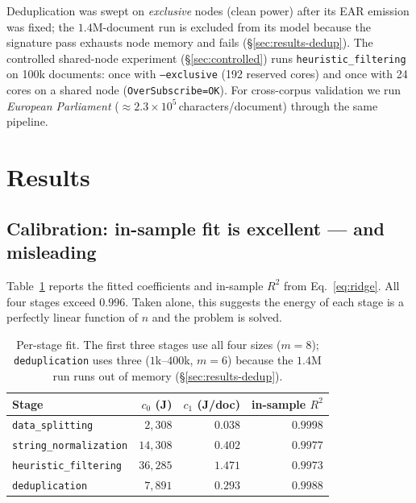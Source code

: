 \documentclass{article}
\begin{document}
Deduplication was swept on \emph{exclusive} nodes (clean power) after its EAR emission was fixed; the $1.4$M-document run is excluded from its model because the signature pass exhausts node memory and fails (\S\ref{sec:results-dedup}). The controlled shared-node experiment (\S\ref{sec:controlled}) runs \texttt{heuristic\_filtering} on 100k documents: once with \texttt{--exclusive} (192 reserved cores) and once with 24 cores on a shared node (\texttt{OverSubscribe=OK}). For cross-corpus validation we run \emph{European Parliament} \cite{koehn2005europarl} (${\approx}2.3{\times}10^5$\,characters/document) through the same pipeline.

\section{Results}

\subsection{Calibration: in-sample fit is excellent --- and misleading}

\label{sec:results-calibration}

Table~\ref{tab:insample} reports the fitted coefficients and in-sample $R^2$ from Eq.~\eqref{eq:ridge}. All four stages exceed $0.996$. Taken alone, this suggests the energy of each stage is a perfectly linear function of $n$ and the problem is solved.

\begin{table}[ht]
  \centering
  \begin{tabular}{lrrr}
    \toprule
    Stage & $c_0$ (J) & $c_1$ (J/doc) & in-sample $R^2$ \\
    \midrule
    \texttt{data\_splitting}       & $2{,}308$  & $0.038$ & $0.9998$ \\
    \texttt{string\_normalization} & $14{,}308$ & $0.402$ & $0.9977$ \\
    \texttt{heuristic\_filtering}  & $36{,}285$ & $1.471$ & $0.9973$ \\
    \texttt{deduplication}         & $7{,}891$  & $0.293$ & $0.9988$ \\
    \bottomrule
  \end{tabular}
  \caption{Per-stage fit. The first three stages use all four sizes ($m=8$); \texttt{deduplication} uses three ($1$k--$400$k, $m=6$) because the $1.4$M run runs out of memory (\S\ref{sec:results-dedup}).}
  \label{tab:insample}
\end{table}
\end{document}
